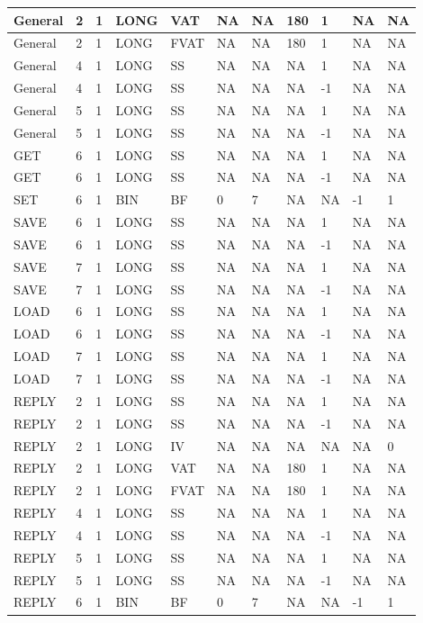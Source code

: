 {\begin{longtable}{|l|l|l|l|l|l|l|l|l|l|l|}
General & 2 & 1 & LONG & VAT & NA & NA & 180 & 1 & NA & NA\\ \hline
General & 2 & 1 & LONG & FVAT & NA & NA & 180 & 1 & NA & NA\\ \hline
General & 4 & 1 & LONG & SS & NA & NA & NA & 1 & NA & NA\\ \hline
General & 4 & 1 & LONG & SS & NA & NA & NA & -1 & NA & NA\\ \hline
General & 5 & 1 & LONG & SS & NA & NA & NA & 1 & NA & NA\\ \hline
General & 5 & 1 & LONG & SS & NA & NA & NA & -1 & NA & NA\\ \hline
GET & 6 & 1 & LONG & SS & NA & NA & NA & 1 & NA & NA\\ \hline
GET & 6 & 1 & LONG & SS & NA & NA & NA & -1 & NA & NA\\ \hline
SET & 6 & 1 & BIN & BF & 0 & 7 & NA & NA & -1 & 1\\ \hline
SAVE & 6 & 1 & LONG & SS & NA & NA & NA & 1 & NA & NA\\ \hline
SAVE & 6 & 1 & LONG & SS & NA & NA & NA & -1 & NA & NA\\ \hline
SAVE & 7 & 1 & LONG & SS & NA & NA & NA & 1 & NA & NA\\ \hline
SAVE & 7 & 1 & LONG & SS & NA & NA & NA & -1 & NA & NA\\ \hline
LOAD & 6 & 1 & LONG & SS & NA & NA & NA & 1 & NA & NA\\ \hline
LOAD & 6 & 1 & LONG & SS & NA & NA & NA & -1 & NA & NA\\ \hline
LOAD & 7 & 1 & LONG & SS & NA & NA & NA & 1 & NA & NA\\ \hline
LOAD & 7 & 1 & LONG & SS & NA & NA & NA & -1 & NA & NA\\ \hline
REPLY & 2 & 1 & LONG & SS & NA & NA & NA & 1 & NA & NA\\ \hline
REPLY & 2 & 1 & LONG & SS & NA & NA & NA & -1 & NA & NA\\ \hline
REPLY & 2 & 1 & LONG & IV & NA & NA & NA & NA & NA & 0\\ \hline
REPLY & 2 & 1 & LONG & VAT & NA & NA & 180 & 1 & NA & NA\\ \hline
REPLY & 2 & 1 & LONG & FVAT & NA & NA & 180 & 1 & NA & NA\\ \hline
REPLY & 4 & 1 & LONG & SS & NA & NA & NA & 1 & NA & NA\\ \hline
REPLY & 4 & 1 & LONG & SS & NA & NA & NA & -1 & NA & NA\\ \hline
REPLY & 5 & 1 & LONG & SS & NA & NA & NA & 1 & NA & NA\\ \hline
REPLY & 5 & 1 & LONG & SS & NA & NA & NA & -1 & NA & NA\\ \hline
REPLY & 6 & 1 & BIN & BF & 0 & 7 & NA & NA & -1 & 1\\ \hline
\end{longtable}}
